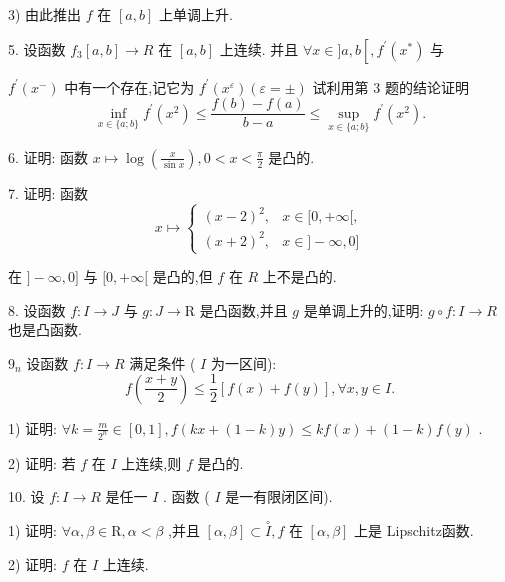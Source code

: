 3) 由此推出 $f$ 在 $\left\lbrack  {a,b}\right\rbrack$ 上单调上升.

5. 设函数 ${f}_{3}\left\lbrack  {a,b}\right\rbrack   \rightarrow  R$ 在 $\left\lbrack  {a,b}\right\rbrack$ 上连续. 并且 $\forall x \in  \rbrack a,b\left\lbrack  {,{f}^{\prime }\left( {x}^{ * }\right) }\right.$ 与

${f}^{\prime }\left( {x}^{ - }\right)$ 中有一个存在,记它为 ${f}^{\prime }\left( {x}^{\varepsilon }\right) \left( {\varepsilon  =  \pm  }\right)$ 试利用第 3 题的结论证明
$$\mathop{\inf }\limits_{{x \in  \{ a;b\} }}{f}^{\prime }\left( {x}^{2}\right)  \leq  \frac{f\left( b\right)  - f\left( a\right) }{b - a} \leq  \mathop{\sup }\limits_{{x \in  \{ a;b\} }}{f}^{\prime }\left( {x}^{2}\right) .$$

6. 证明: 函数 $x \mapsto  \log \left( \frac{x}{\sin x}\right) ,0 < x < \frac{\pi }{2}$ 是凸的.

7. 证明: 函数
$$x \mapsto  \left\{  \begin{array}{ll} {\left( x - 2\right) }^{2}, & x \in  \lbrack 0, + \infty \lbrack , \\  {\left( x + 2\right) }^{2}, & x \in  \rbrack  - \infty ,0\rbrack  \end{array}\right.$$

在 $\rbrack  - \infty ,0\rbrack$ 与 $\lbrack 0, + \infty \lbrack$ 是凸的,但 $f$ 在 $R$ 上不是凸的.

8. 设函数 $f : I \rightarrow  J$ 与 $g : J \rightarrow  \mathrm{R}$ 是凸函数,并且 $g$ 是单调上升的,证明: $g \circ  f : I \rightarrow  R$ 也是凸函数.

${9}_{n}$ 设函数 $f : I \rightarrow  R$ 满足条件 ( $I$ 为一区间):
$$f\left( \frac{x + y}{2}\right)  \leq  \frac{1}{2}\left\lbrack  {f\left( x\right)  + f\left( y\right) }\right\rbrack  ,\forall x,y \in  I.$$

1) 证明: $\forall k = \frac{m}{{2}^{n}} \in  \left\lbrack  {0,1}\right\rbrack  ,f\left( {{kx} + \left( {1 - k}\right) y}\right)  \leq  {kf}\left( x\right)  + \left( {1 - k}\right) f\left( y\right)$ .

2) 证明: 若 $f$ 在 $I$ 上连续,则 $f$ 是凸的.

10. 设 $f : I \rightarrow  R$ 是任一 $I$ . 函数 ( $I$ 是一有限闭区间).

1) 证明: $\forall \alpha ,\beta  \in  \mathrm{R},\alpha  < \beta$ ,并且 $\left\lbrack  {\alpha ,\beta }\right\rbrack   \subset  \overset{ \circ  }{I},f$ 在 $\left\lbrack  {\alpha ,\beta }\right\rbrack$ 上是 Lipschitz函数.

2) 证明: $f$ 在 $I$ 上连续.

